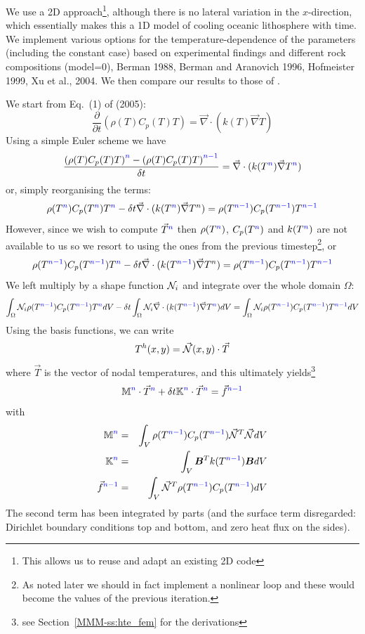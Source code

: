 We use a 2D approach\footnote{This allows us to reuse and adapt an existing 2D code}, 
although there is no lateral variation in the $x$-direction, 
which essentially makes this a 1D model of cooling oceanic lithosphere with time. 
We implement various options for the temperature-dependence of the parameters (including the constant case) 
based on experimental findings and different rock compositions \textcite{pasc77} ({\python model=0}), 
Berman 1988, Berman and Aranovich 1996, Hofmeister 1999, Xu et al., 2004. 
We then compare our results to those of \textcite{rihc18}.

We start from Eq.~(1) of \textcite{mcjp05} (2005):
\[
\frac{\partial}{\partial t}
\left(\rho(T) C_p(T) T \right) = \vec\nabla \cdot \left(k(T) \vec\nabla T \right)
\]
Using a simple Euler scheme we have
\[
\frac{ \left(\rho(T) C_p(T) T \right)^{\color{blue}n} - \left(\rho(T) C_p(T) T \right)^{\color{blue}n-1} }
{\delta t}   = \vec\nabla \cdot (k(T^{\color{blue}n}) \vec\nabla T^{\color{blue}n})
\]
or, simply reorganising the terms: 
\[
\rho(T^{\color{blue}n}) C_p(T^{\color{blue}n}) T^{{\color{blue}n}} - 
\delta t \vec\nabla \cdot (k(T^{\color{blue}n}) \vec\nabla T^n)
= \rho(T^{\color{blue}n-1}) C_p(T^{\color{blue}n-1}) T^{\color{blue}n-1} 
\]
However, since we wish to compute $\vec{T}^{\color{blue} n}$ then 
$\rho(T^{\color{blue}n})$, $C_p(T^{\color{blue}n})$ and $k(T^{\color{blue}n})$ are
not available to us so we resort to using the ones from the previous timestep\footnote{As noted
later we should in fact implement a nonlinear loop and these would become the values 
of the previous iteration.}, or
\[
\rho(T^{\color{blue}n-1}) C_p(T^{\color{blue}n-1}) T^{{\color{blue}n}} - 
\delta t \vec\nabla \cdot (k(T^{\color{blue}n-1}) \vec\nabla T^n)
= \rho(T^{\color{blue}n-1}) C_p(T^{\color{blue}n-1}) T^{\color{blue}n-1} 
\]
We left multiply by a shape function ${\mathcal{N}}_i$ and integrate over the whole domain $\Omega$:
\[
\int_\Omega {\mathcal{N}}_i \rho(T^{\color{blue}n-1}) C_p(T^{\color{blue}n-1}) T^{{\color{blue}n}} dV-
\delta t \int_\Omega {\mathcal{N}}_i \vec\nabla \cdot (k(T^{\color{blue}n-1}) \vec\nabla T^{\color{blue}n}) dV
= 
\int_\Omega {\mathcal{N}}_i\rho(T^{\color{blue} n-1}) C_p(T^{\color{blue}n-1}) T^{\color{blue} n-1} dV
\]
Using the basis functions, we can write
\[
T^h(x,y) = \vec{{\mathcal{N}}}(x,y) \cdot \vec{T}
\]
where $\vec{T}$ is the vector of nodal temperatures, and this ultimately 
yields\footnote{see Section~\ref{MMM-ss:hte_fem}
for the derivations}
\[
{\bm {{\mathbb{M}}}}^{\color{blue}n} \cdot \vec{T}^{\color{blue}n} 
+ \delta t {\bm {{\mathbb{K}}}}^{\color{blue}n} \cdot \vec{T}^{\color{blue}n} = \vec{f}^{\color{blue} n-1}
\]
with
\begin{eqnarray}
{\bm {{\mathbb{M}}}}^{\color{blue}n} &=& \int_V \rho(T^{\color{blue}n-1}) C_p(T^{\color{blue}n-1}) \vec{{\mathcal{N}}}^T \vec{{\mathcal{N}}} dV  \nonumber\\
{\bm {{\mathbb{K}}}}^{\color{blue}n} &=& \int_V {\bm B}^T k(T^{\color{blue}n-1}) {\bm B} dV \nonumber\\
\vec{f}^{\color{blue} n-1} &=& \int_V \vec{{\mathcal{N}}}^T \rho(T^{\color{blue} n-1}) C_p(T^{\color{blue}n-1}) dV \nonumber
\end{eqnarray}
The second term has been integrated by parts (and the surface term disregarded:
Dirichlet boundary conditions top and bottom, and zero heat flux on the sides).

